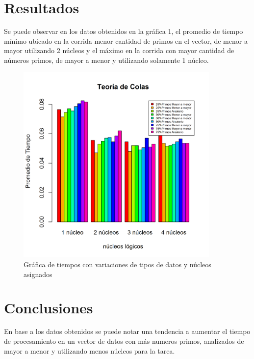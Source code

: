 \documentclass{article}
\begin{document}
\section{Resultados}

Se puede observar en los datos obtenidos en la gráfica 1, el promedio de tiempo mínimo ubicado en la corrida menor cantidad de primos en el vector, de menor a mayor utilizando 2 núcleos y el máximo en la corrida con mayor cantidad de números primos, de mayor a menor y utilizando solamente 1 núcleo.
\begin{figure}[hbtp]
\centering
\includegraphics[width=10cm]{teoria_de_colas.png}
\caption{Gráfica de tiempos con variaciones de tipos de datos y núcleos asignados}
\end{figure}


\section{Conclusiones}
En base a los datos obtenidos se puede notar una tendencia a aumentar el tiempo de procesamiento en un vector de datos con más numeros primos, analizados de mayor a menor y utilizando menos núcleos para la tarea.











\end{document}
